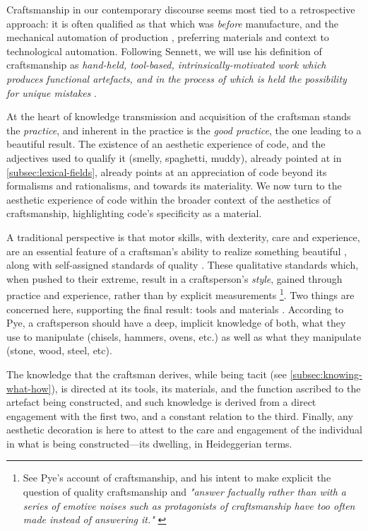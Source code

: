 Craftsmanship in our contemporary discourse seems most tied to a retrospective approach: it is often qualified as that which was \emph{before} manufacture, and the mechanical automation of production \citep{thompson_study_1934}, preferring materials and context to technological automation. Following Sennett, we will use his definition of craftsmanship as \emph{hand-held, tool-based, intrinsically-motivated work which produces functional artefacts, and in the process of which is held the possibility for unique mistakes} \citep{sennett_craftsman_2009}.

At the heart of knowledge transmission and acquisition of the craftsman stands the \emph{practice}, and inherent in the practice is the \emph{good practice}, the one leading to a beautiful result. The existence of an aesthetic experience of code, and the adjectives used to qualify it (smelly, spaghetti, muddy), already pointed at in \ref{subsec:lexical-fields}, already points at an appreciation of code beyond its formalisms and rationalisms, and towards its materiality. We now turn to the aesthetic experience of code within the broader context of the aesthetics of craftsmanship, highlighting code's specificity as a material.

A traditional perspective is that motor skills, with dexterity, care and experience, are an essential feature of a craftsman's ability to realize something beautiful \citep{osborne_aesthetic_1977}, along with self-assigned standards of quality \citep{pye_nature_2008,sennett_craftsman_2009}. These qualitative standards which, when pushed to their extreme, result in a craftsperson's \emph{style}, gained through practice and experience, rather than by explicit measurements \citep{pye_nature_2008} \footnote{See Pye's account of craftsmanship, and his intent to make explicit the question of quality craftsmanship and \emph{"answer factually rather than with a series of emotive noises such as protagonists of craftsmanship have too often made instead of answering it."} \citep{pye_nature_2008}}. Two things are concerned here, supporting the final result: tools and materials \citep{pye_nature_2008}. According to Pye, a craftsperson should have a deep, implicit knowledge of both, what they use to manipulate (chisels, hammers, ovens, etc.) as well as what they manipulate (stone, wood, steel, etc).

The knowledge that the craftsman derives, while being tacit (see \ref{subsec:knowing-what-how}), is directed at its tools, its materials, and the function ascribed to the artefact being constructed, and such knowledge is derived from a direct engagement with the first two, and a constant relation to the third. Finally, any aesthetic decoration is here to attest to the care and engagement of the individual in what is being constructed—its dwelling, in Heideggerian terms.

